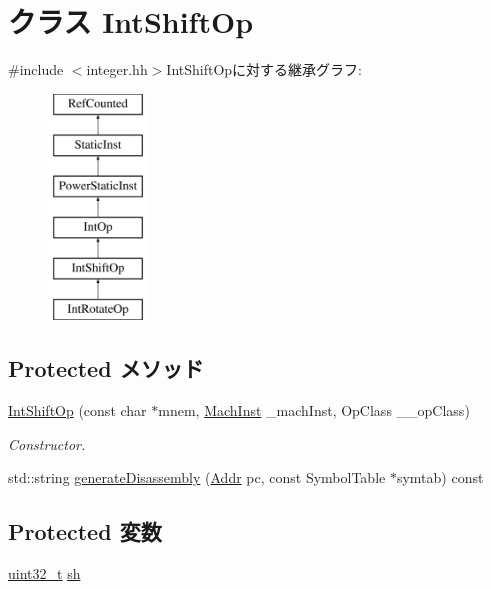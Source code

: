 \hypertarget{classPowerISA_1_1IntShiftOp}{
\section{クラス IntShiftOp}
\label{classPowerISA_1_1IntShiftOp}
}


{\ttfamily \#include $<$integer.hh$>$}IntShiftOpに対する継承グラフ:\begin{figure}[H]
\begin{center}
\leavevmode
\includegraphics[height=6cm]{classPowerISA_1_1IntShiftOp}
\end{center}
\end{figure}
\subsection*{Protected メソッド}
\begin{DoxyCompactItemize}
\item 
\hyperlink{classPowerISA_1_1IntShiftOp_a2c5479a977540588d8aa9b83ffd923eb}{IntShiftOp} (const char $\ast$mnem, \hyperlink{namespacePowerISA_a301c22ea09fa33dcfe6ddf22f203699c}{MachInst} \_\-machInst, OpClass \_\-\_\-opClass)
\begin{DoxyCompactList}\small\item\em Constructor. \item\end{DoxyCompactList}\item 
std::string \hyperlink{classPowerISA_1_1IntShiftOp_a3134956ec18bb095818e06eb988f6c55}{generateDisassembly} (\hyperlink{base_2types_8hh_af1bb03d6a4ee096394a6749f0a169232}{Addr} pc, const SymbolTable $\ast$symtab) const 
\end{DoxyCompactItemize}
\subsection*{Protected 変数}
\begin{DoxyCompactItemize}
\item 
\hyperlink{Type_8hh_a435d1572bf3f880d55459d9805097f62}{uint32\_\-t} \hyperlink{classPowerISA_1_1IntShiftOp_a2b6cd065d4330a52705b9237b1062c6a}{sh}
\end{DoxyCompactItemize}


